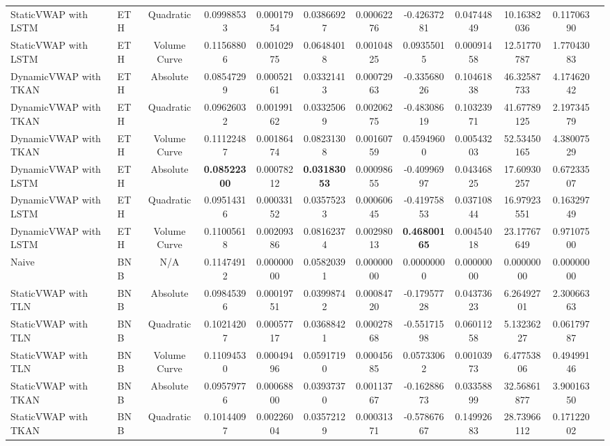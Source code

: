 \begin{table}[H]
{\begin{tabular}{llcccccccccc}
        StaticVWAP with LSTM & ETH & Quadratic & 0.09988533 & 0.00017954 & 0.03866927 & 0.00062276 & -0.42637281 & 0.04744849 & 10.16382036 & 0.11706390 \\
        StaticVWAP with LSTM & ETH & Volume Curve & 0.11568806 & 0.00102975 & 0.06484018 & 0.00104825 & 0.09355015 & 0.00091458 & 12.51770787 & 1.77043083 \\
        DynamicVWAP with TKAN & ETH & Absolute & 0.08547299 & 0.00052161 & 0.03321413 & 0.00072963 & -0.33568026 & 0.10461838 & 46.32587733 & 4.17462042 \\
        DynamicVWAP with TKAN & ETH & Quadratic & 0.09626032 & 0.00199162 & 0.03325069 & 0.00206275 & -0.48308619 & 0.10323971 & 41.67789125 & 2.19734579 \\
        DynamicVWAP with TKAN & ETH & Volume Curve & 0.11122487 & 0.00186474 & 0.08231308 & 0.00160759 & 0.45949600 & 0.00543203 & 52.53450165 & 4.38007529 \\
        DynamicVWAP with LSTM & ETH & Absolute & \textbf{0.08522300} & 0.00078212 & \textbf{0.03183053} & 0.00098655 & -0.40996997 & 0.04346825 & 17.60930257 & 0.67233507 \\
        DynamicVWAP with LSTM & ETH & Quadratic & 0.09514316 & 0.00033152 & 0.03575233 & 0.00060645 & -0.41975853 & 0.03710844 & 16.97923551 & 0.16329749 \\
        DynamicVWAP with LSTM & ETH & Volume Curve & 0.11005618 & 0.00209386 & 0.08162374 & 0.00298013 & \textbf{0.46800165} & 0.00454018 & 23.17767649 & 0.97107500 \\
        \hline
        Naive & BNB & N/A & 0.11474912 & 0.00000000 & 0.05820391 & 0.00000000 & 0.00000000 & 0.00000000 & 0.00000000 & 0.00000000 \\
        StaticVWAP with TLN & BNB & Absolute & 0.09845396 & 0.00019751 & 0.03998742 & 0.00084720 & -0.17957728 & 0.04373623 & 6.26492701 & 2.30066363 \\
        StaticVWAP with TLN & BNB & Quadratic & 0.10214207 & 0.00057717 & 0.03688421 & 0.00027868 & -0.55171598 & 0.06011258 & 5.13236227 & 0.06179787 \\
        StaticVWAP with TLN & BNB & Volume Curve & 0.11094530 & 0.00049496 & 0.05917190 & 0.00045685 & 0.05733062 & 0.00103973 & 6.47753806 & 0.49499146 \\
        StaticVWAP with TKAN & BNB & Absolute & 0.09579776 & 0.00068800 & 0.03937370 & 0.00113767 & -0.16288673 & 0.03358899 & 32.56861877 & 3.90016350 \\
        StaticVWAP with TKAN & BNB & Quadratic & 0.10144097 & 0.00226004 & 0.03572129 & 0.00031371 & -0.57867667 & 0.14992683 & 28.73966112 & 0.17122002 \\

\end{tabular}}
\end{table}
